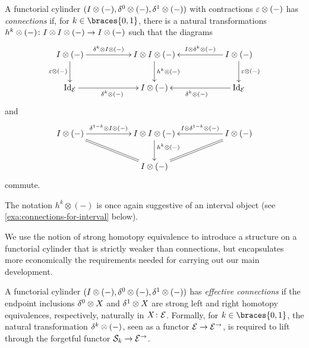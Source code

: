 \documentclass[reqno,10pt,a4paper,oneside]{amsart}
\begin{document}
\begin{definition} \label{def:connections}
A functorial cylinder $(I \otimes (-), \delta^0 \otimes (-), \delta^1 \otimes (-))$ with contractions $\varepsilon \otimes (-)$ has \emph{connections} if, for $k \in \braces{0, 1}$, there is a natural transformations $h^k \otimes (-) \colon I \otimes I \otimes (-) \to I \otimes (-)$ such that the diagrams
\begin{equation} \label{connections:0}
\xymatrix@C+3em{
  \interval \otimes (-)
  \ar[r]^-{\kcyl \otimes \interval \otimes (-)}
  \ar[d]_{\ccyl \otimes (-)}
&
  \interval \otimes \interval \otimes (-)
  \ar[d]^{h^k \otimes (-)}
&
  \interval \otimes (-)
  \ar[l]_-{\interval \otimes \kcyl \otimes (-)}
  \ar[d]^{\ccyl \otimes (-)}
\\
  \Id_\catE
  \ar[r]_{\kcyl \otimes (-)}
&
  \interval \otimes (-)
&
  \Id_\catE
  \ar[l]^{\kcyl \otimes (-)}
}
\end{equation}
and
\begin{equation} \label{connections:1}
\xymatrix@C+3em{
  \interval \otimes (-)
  \ar[r]^-{\kcylinv \otimes \interval \otimes (-)}
  \ar@{=}[dr]
&
  \interval \otimes \interval \otimes (-)
  \ar[d]^(0.4){h^k \otimes (-)}
&
  \interval \otimes (-)
  \ar[l]_-{\interval \otimes \kcylinv \otimes (-)}
  \ar@{=}[dl]
\\&
  \interval \otimes (-)
}
\end{equation}
commute.
\end{definition}

The notation $h^k \otimes (-)$ is once again suggestive of an interval object (see \cref{exa:connections-for-interval} below).

We use the notion of strong homotopy equivalence to introduce a structure on a functorial cylinder that is strictly weaker than connections, but encapsulates more economically the requirements needed for carrying out our main development.

\begin{definition} \label{def:effective-connections}
A functorial cylinder $(I \otimes (-), \delta^0 \otimes (-), \delta^1 \otimes (-))$ has \emph{effective connections} if the endpoint inclusions $\delta^0 \otimes X$ and $\delta^1 \otimes X$ are strong left and right homotopy equivalences, respectively, naturally in $X \colon \mathcal{E}$.
Formally, for $k \in \braces{0, 1}$, the natural transformation $\delta^k \otimes (-)$, seen as a functor $\mathcal{E} \to \mathcal{E}^\to$, is required to lift through the forgetful functor $\mathcal{S}_k \to \mathcal{E}^\to$.
\end{definition}
\end{document}
